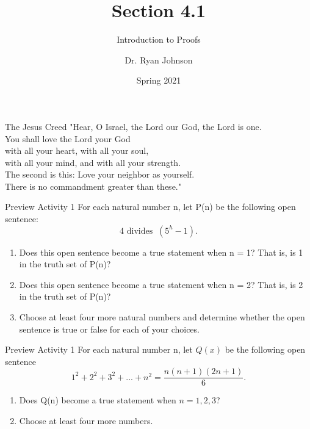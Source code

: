 \documentclass{beamer}
\title{Section 4.1}
\subtitle{Introduction to Proofs}
\author{Dr. Ryan Johnson}
\institute{Grace College}
\date{Spring 2021}
\newcounter{saveenumi}
\newcommand{\seti}{\setcounter{saveenumi}{\value{enumi}}}
\newcommand{\conti}{\setcounter{enumi}{\value{saveenumi}}}
\begin{document}
\begin{frame}[plain]
    \maketitle
\end{frame}

\begin{frame}{The Jesus Creed}
\Large{
"Hear, O Israel, the Lord our God, the Lord is one.\\
You shall love the Lord your God\\
\;\; with all your heart, with all your soul,\\
\;\; with all your mind, and with all your strength.\\
The second is this: Love your neighbor as yourself.\\
There is no commandment greater than these."
}
\end{frame}

\begin{frame}{Preview Activity 1}
    For each natural number n, let P(n) be the following open sentence:
    \[4 \text{ divides }\ (5^h-1). \] \pause
\begin{enumerate}
    \item Does this open sentence become a true statement when n = 1? That is, is 1 in the truth set of P(n)? \pause
    \item Does this open sentence become a true statement when n = 2? That is, is 2 in the truth set of P(n)? \pause
    \item Choose at least four more natural numbers and determine whether the open sentence is true or false for each of your choices.
    \seti
\end{enumerate}
\end{frame}

\begin{frame}{Preview Activity 1}
    For each natural number n, let $Q(x)$ be the following open sentence
    \[
    1^2 + 2^2 + 3^2 + ... + n^2 = \frac{n(n+1)(2n+1)}{6}.
    \] \pause
    \begin{enumerate}
        \conti
        \item Does Q(n) become a true statement when $n = 1,2,3$? \pause
        \item Choose at least four more numbers.
    \end{enumerate}
\end{frame}
\end{document}
